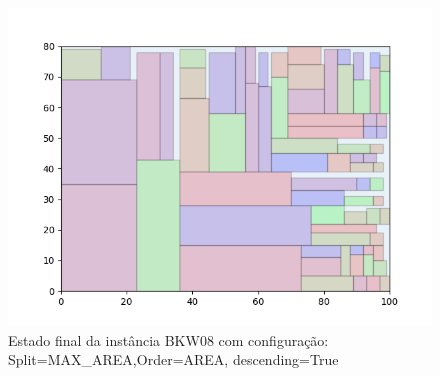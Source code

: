 \begin{figure}[H]
    \centering
    \caption[]{Estado final da instância BKW08 com configuração: Split=MAX_AREA,Order=AREA, descending=True}
    \label{fig:bkw08-max_area-area-true}
    \includegraphics[scale=0.5]{output/figures/bkw/bkw08/max_area/area/true/00}
\end{figure}